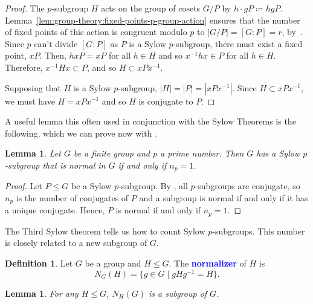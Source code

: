 \documentclass[12pt]{report}
\newcommand{\indx}[1]{\index{#1}\textbf{\textcolor{blue}{#1}}}
\newtheorem{lemma}[theorem]{Lemma}
\theoremstyle{definition}
\newtheorem{definition}[theorem]{Definition}
\begin{document}
\begin{proof}
  The \(p\)-subgroup \(H\) acts on the group of cosets \(G/P\) by \(h \cdot gP \coloneqq hgP\). Lemma~\ref{lem:group-theory:fixed-points-p-group-action} ensures that the number of fixed points of this action is congruent modulo \(p\) to \(|G/P| = [G : P] = r\), by~. Since \(p\) can't divide \([G : P]\) as \(P\) is a Sylow \(p\)-subgroup, there must exist a fixed point, \(xP\). Then, \(hxP = xP\) for all \(h \in H\) and so \(x^{-1}hx \in P\) for all \(h \in H\). Therefore, \(x^{-1}Hx \subset P\), and so \(H \subset xPx^{-1}\).

  Supposing that \(H\) is a Sylow \(p\)-subgroup, \(|H| = |P| = |xPx^{-1}|\). Since \(H \subset xPx^{-1}\), we must have \(H = xPx^{-1}\) and so \(H\) is conjugate to \(P\).
\end{proof}

A useful lemma this often used in conjunction with the Sylow Theorems is the following, which we can prove now with .

\begin{lemma}\label{lem:group-theory:p-group-normal-iff-np=1}
  Let \(G\) be a finite group and \(p\) a prime number. Then \(G\) has a Sylow \(p\)-subgroup that is normal in \(G\) if and only if \(n_{p} = 1\).
\end{lemma}

\begin{proof}
  Let \(P \leq G\) be a Sylow \(p\)-subgroup. By , all \(p\)-subgroups are conjugate, so \(n_{p}\) is the number of conjugates of \(P\) and a subgroup is normal if and only if it has a unique conjugate. Hence, \(P\) is normal if and only if \(n_{p} = 1\).
\end{proof}

The Third Sylow theorem tells us how to count Sylow \(p\)-subgroups. This number is closely related to a new subgroup of \(G\).

\begin{definition}\label{def:group-theory:normalizer}
  Let \(G\) be a group and \(H \leq G\). The \indx{normalizer} of \(H\) is
  \[N_{G}(H) = \{g \in G \mid gHg^{-1} = H\}.\]
\end{definition}

\begin{lemma}
  For any \(H \leq G\), \(N_{H}(G)\) is a subgroup of \(G\).
\end{lemma}
\end{document}
